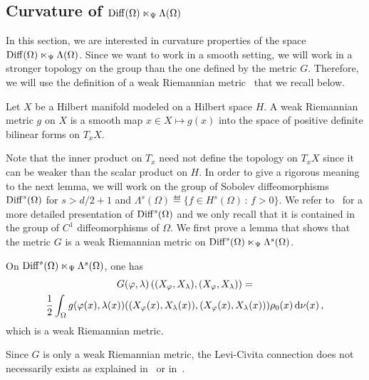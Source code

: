 \subsection[Curvature of Diff(Omega) x\_Psi Lambda(Omega)]{Curvature of $\operatorname{Diff}(\Omega) \ltimes_\Psi \Lambda(\Omega)$}
In this section, we are interested in curvature properties of the space $\operatorname{Diff}(\Omega) \ltimes_\Psi \Lambda(\Omega)$. %
Since we want to work in a smooth setting, we will work in a stronger topology on the group than the one defined by the metric $G$. Therefore, we will use the definition of a weak Riemannian metric~\cite[Section 9]{em70} that we recall below.
\begin{definition}
Let $X$ be a Hilbert manifold modeled on a Hilbert space $H$. A weak Riemannian metric $g$ on $X$ is a smooth map $x \in X \mapsto g(x)$ into the space of positive definite bilinear forms on $T_xX$.
\end{definition}
Note that  the inner product on $T_x$ need not define the topology on $T_xX$ since it can be weaker than the scalar product on $H$.
In order to give a rigorous meaning to the next lemma, we will work on the group of Sobolev diffeomorphisms $\operatorname{Diff}^{s}(\Omega)$ for $s> d/2+1$ and $\Lambda^s(\Omega) \eqdef \{  f \in H^s(\Omega) \, : \, f > 0\}$. We refer to~\cite{BruverisVialard} for a more detailed presentation of $\operatorname{Diff}^{s}(\Omega)$ and we only recall that it is contained in the group of $C^1$ diffeomorphisms of $\Omega$. 
We first prove a lemma that shows that the metric $G$ is a weak Riemannian metric on $\operatorname{Diff}^{s}(\Omega) \ltimes_\Psi \Lambda^s(\Omega)$. %
\begin{lemma}\label{L2Norm}
On $\operatorname{Diff}^{s}(\Omega) \ltimes_\Psi \Lambda^s(\Omega)$, one has
\begin{multline}\label{SimplifiedG}
G(\varphi,\lambda)\left((X_\varphi,X_\lambda) , (X_\varphi,X_\lambda)\right) = \\ \frac{1}{2} \int_{\Omega} g(\varphi(x),\lambda(x))((X_\varphi(x),X_\lambda(x)),(X_\varphi(x),X_\lambda(x)))  \rho_0(x) \, \mathrm{d} \nu(x) \,,
\end{multline}
which is a weak Riemannian metric.
\end{lemma}

\begin{remark} Since $G$ is only a weak Riemannian metric, the Levi-Civita connection does not necessarily exists as explained in~\cite{em70} or in~\cite{SobolevMetricsCurvature}. 
\end{remark}



